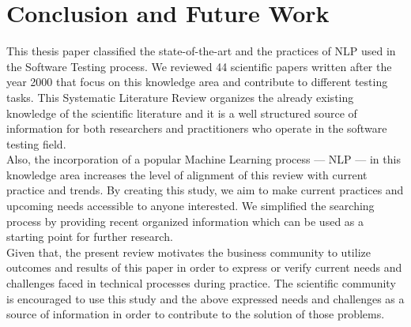 \section {Conclusion and Future Work}

This thesis paper classified the state-of-the-art and the practices of NLP used in the Software Testing process. We reviewed 44 scientific papers written after the year 2000 that focus on this 
knowledge area and contribute to different testing tasks. This Systematic Literature Review organizes the already existing knowledge of the scientific literature and it is a well structured source of 
information for both researchers and practitioners who operate in the software testing field.\\

Also, the incorporation of a popular Machine Learning process --- NLP --- in this knowledge area increases the level of alignment of this review with current practice and trends. By creating this study, 
we aim to make current practices and upcoming needs accessible to anyone interested. We simplified the searching process by providing recent organized information which can be used as a starting point 
for further research.\\

Given that, the present review motivates the business community to utilize outcomes and results of this paper in order to express or verify current needs and challenges faced in technical processes during 
practice. The scientific community is encouraged to use this study and the above expressed needs and challenges as a source of information in order to contribute to the solution of those problems.
